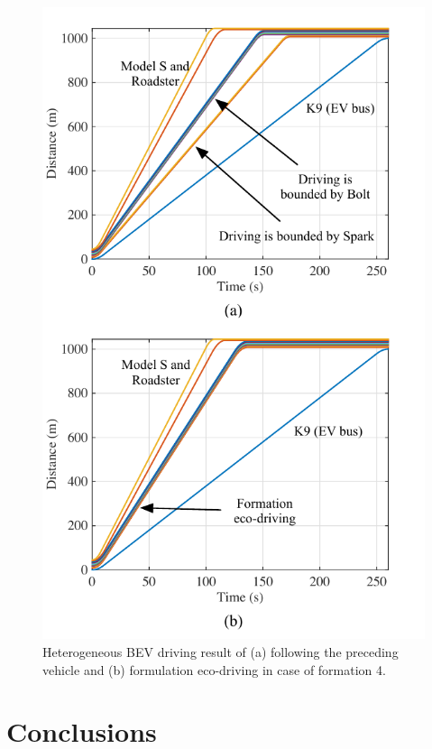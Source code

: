 \documentclass{IEEEtran}
\begin{document}
\begin{figure}	%
\centering
\includegraphics[width=1.0\hsize]{Figures/Driving_comparison.pdf}
\caption{Heterogeneous BEV driving result of (a) following the preceding vehicle and (b) formulation eco-driving in case of formation 4.}
\label{fig:driving_comp}
\end{figure} 


\section{Conclusions}




\end{document}
